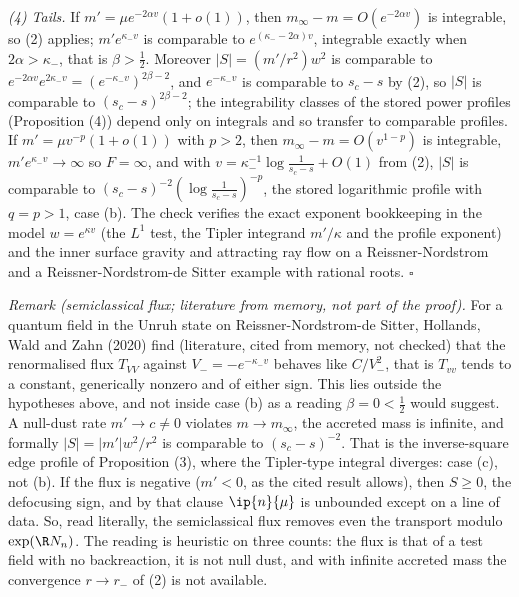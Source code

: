 \emph{(4) Tails.} If $m' = \mu e^{-2\alpha v}(1 + o(1))$, then $m_{\infty} - m = O(e^{-2\alpha v})$ is integrable, so (2) applies; $m'e^{\kappa_{-}v}$ is comparable to $e^{(\kappa_{-} - 2\alpha)v}$, integrable exactly when $2\alpha > \kappa_{-}$, that is $\beta > \frac12$. Moreover $|S| = (m'/r^{2})w^{2}$ is comparable to $e^{-2\alpha v}e^{2\kappa_{-}v} = (e^{-\kappa_{-}v})^{2\beta - 2}$, and $e^{-\kappa_{-}v}$ is comparable to $s_{c} - s$ by (2), so $|S|$ is comparable to $(s_{c} - s)^{2\beta - 2}$; the integrability classes of the stored power profiles (Proposition (4)) depend only on integrals and so transfer to comparable profiles. If $m' = \mu v^{-p}(1 + o(1))$ with $p > 2$, then $m_{\infty} - m = O(v^{1 - p})$ is integrable, $m'e^{\kappa_{-}v} \to \infty$ so $F = \infty$, and with $v = \kappa_{-}^{-1}\log\frac{1}{s_{c} - s} + O(1)$ from (2), $|S|$ is comparable to $(s_{c} - s)^{-2}(\log\frac{1}{s_{c} - s})^{-p}$, the stored logarithmic profile with $q = p > 1$, case (b). The check verifies the exact exponent bookkeeping in the model $w = e^{\kappa v}$ (the $L^{1}$ test, the Tipler integrand $m'/\kappa$ and the profile exponent) and the inner surface gravity and attracting ray flow on a Reissner-Nordstrom and a Reissner-Nordstrom-de Sitter example with rational roots. $\square$

\emph{Remark (semiclassical flux; literature from memory, not part of the proof).} For a quantum field in the Unruh state on Reissner-Nordstrom-de Sitter, Hollands, Wald and Zahn (2020) find (literature, cited from memory, not checked) that the renormalised flux $T_{VV}$ against $V_{-} = -e^{-\kappa_{-}v}$ behaves like $C/V_{-}^{2}$, that is $T_{vv}$ tends to a constant, generically nonzero and of either sign. This lies outside the hypotheses above, and not inside case (b) as a reading $\beta = 0 < \tfrac12$ would suggest. A null-dust rate $m' \to c \neq 0$ violates $m \to m_{\infty}$, the accreted mass is infinite, and formally $|S| = |m'|w^{2}/r^{2}$ is comparable to $(s_{c} - s)^{-2}$. That is the inverse-square edge profile of Proposition (3), where the Tipler-type integral diverges: case (c), not (b). If the flux is negative ($m' < 0$, as the cited result allows), then $S \ge 0$, the defocusing sign, and by that clause $\ip{n}{\mu}$ is unbounded except on a line of data. So, read literally, the semiclassical flux removes even the transport modulo $\exp(\R N_{n})$. The reading is heuristic on three counts: the flux is that of a test field with no backreaction, it is not null dust, and with infinite accreted mass the convergence $r \to r_{-}$ of (2) is not available.
